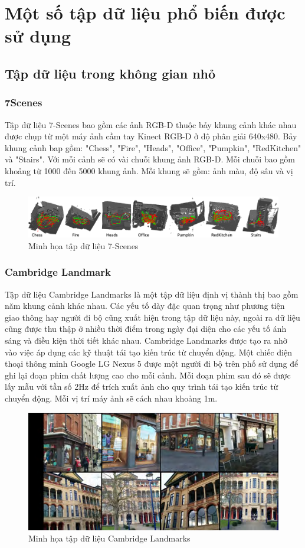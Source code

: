 \section{Một số tập dữ liệu phổ biến được sử dụng}
\subsection{Tập dữ liệu trong không gian nhỏ}
\subsubsection*{7Scenes}
Tập dữ liệu 7-Scenes \cite{6619221} bao gồm các ảnh RGB-D thuộc bảy khung cảnh khác nhau được chụp từ một máy ảnh cầm tay Kinect RGB-D ở độ phân giải 640x480. Bảy khung cảnh bap gồm: "Chess", "Fire", "Heads", "Office", "Pumpkin", "RedKitchen" và "Stairs". Với mỗi cảnh sẽ có vài chuỗi khung ảnh RGB-D. Mỗi chuỗi bao gồm khoảng từ 1000 đến 5000 khung ảnh. Mỗi khung sẽ gồm: ảnh màu, độ sâu và vị trí.
\begin{figure}[H]
    \centering
    \includegraphics[width=\textwidth]{pics/Chapter2/7scenes.png}
    \caption{Minh họa tập dữ liệu 7-Scenes \cite{6619221}}
\end{figure}
\subsubsection*{Cambridge Landmark}
Tập dữ liệu Cambridge Landmarks \cite{kendall2016posenet} là một tập dữ liệu định vị thành thị bao gồm năm khung cảnh khác nhau. Các yếu tố dày đặc quan trọng như phương tiện giao thông hay người đi bộ cũng xuất hiện trong tập dữ liệu này, ngoài ra dữ liệu cũng được thu thập ở nhiều thời điểm trong ngày đại diện cho các yếu tố ánh sáng và điều kiện thời tiết khác nhau. Cambridge Landmarks được tạo ra nhờ vào việc áp dụng các kỹ thuật tái tạo kiến trúc từ chuyển động. Một chiếc điện thoại thông minh Google LG Nexus 5 được một người đi bộ trên phố sử dụng để ghi lại đoạn phim chất lượng cao cho mỗi cảnh. Mỗi đoạn phim sau đó sẽ được lấy mẫu với tần số 2Hz để trích xuất ảnh cho quy trình tái tạo kiến trúc từ chuyển động. Mỗi vị trí máy ảnh sẽ cách nhau khoảng 1m.
\begin{figure}[H]
    \centering
    \includegraphics[width=\textwidth]{pics/Chapter2/cambridge.png}
    \caption{Minh họa tập dữ liệu Cambridge Landmarks \cite{kendall2016posenet}}
\end{figure}
